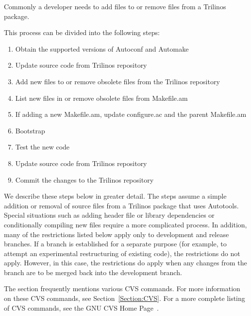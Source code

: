 \documentclass[12pt,relax]{TrilinosDevGuide}
\begin{document}
Commonly a developer needs to add files to or remove files from a Trilinos 
package.  

This process can be divided into the following steps:

\begin{enumerate}
\item Obtain the supported versions of Autoconf and Automake
\item Update source code from Trilinos repository
\item Add new files to or remove obsolete files from the Trilinos repository
\item List new files in or remove obsolete files from Makefile.am
\item If adding a new Makefile.am, update configure.ac and the parent 
Makefile.am
\item Bootstrap
\item Test the new code
\item Update source code from Trilinos repository
\item Commit the changes to the Trilinos repository
\end{enumerate}

We describe these steps below in greater detail.  The steps assume a simple 
addition or removal of source files from a Trilinos package that uses 
Autotools.  Special situations such as adding header file or library 
dependencies or conditionally compiling new files require a more complicated 
process.  In addition, many of the restrictions listed below apply only to 
development and release branches.  If a branch is 
established for a separate purpose (for example, to attempt an experimental 
restructuring of existing code), the restrictions do not apply.  However, in 
this case, the restrictions do apply when any changes from the branch are to 
be merged back into the development branch.  

The section frequently mentions various CVS commands.  For more information on 
these CVS commands, see Section~\ref{Section:CVS}.   For a 
more complete listing of CVS commands, see the GNU CVS Home Page~\cite{CVS}.
 
\end{document}
